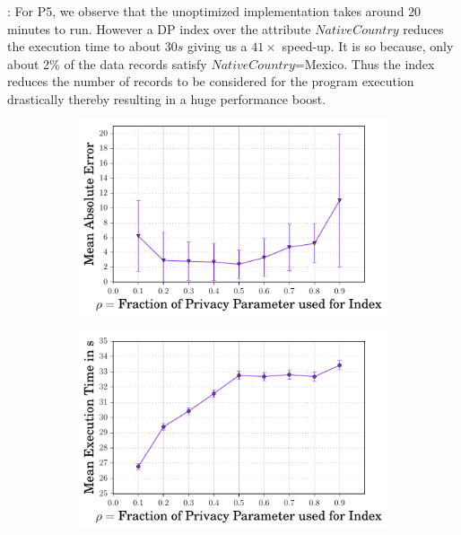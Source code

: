: For P5, we observe that the unoptimized implementation takes around $20$ minutes to run. However  a DP index over the attribute $NativeCountry$  reduces the execution time to about $30s$ giving us a $41\times $ speed-up. It is so because, only about 2\% of the data records satisfy $NativeCountry$=Mexico. Thus the index reduces the number of records to be considered for the program execution drastically thereby resulting in a huge performance boost. %
 \begin{figure}[ht]
   \begin{subfigure}[b]{0.45\linewidth}
    \centering \includegraphics[width=1\linewidth]{index_error.pdf}   \caption{}
        \label{fig:error:}\end{subfigure}
        \begin{subfigure}[b]{0.45\linewidth}
        \includegraphics[width=1\linewidth]{index_time.pdf}   \caption{}

\end{subfigure}
\end{figure}
